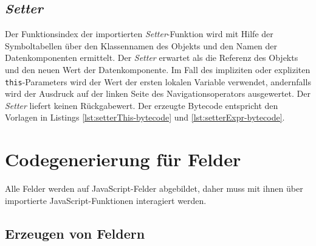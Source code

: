 



\subsection{\emph{Setter}}
\label{subsec:Zugriff-auf-Datenkomponenten-Setter}

Der Funktionsindex der importierten \emph{Setter}-Funktion wird mit Hilfe der Symboltabellen über den Klassennamen des Objekts und den Namen der Datenkomponenten ermittelt. Der \emph{Setter} erwartet als die Referenz des Objekts und den neuen Wert der Datenkomponente. Im Fall des impliziten oder expliziten \lstinline{this}-Parameters wird der Wert der ersten lokalen Variable verwendet, andernfalls wird der Ausdruck auf der linken Seite des Navigationsoperators ausgewertet. Der \emph{Setter} liefert keinen Rückgabewert. Der erzeugte Bytecode entspricht den Vorlagen in Listings \ref{lst:setterThis-bytecode} und \ref{lst:setterExpr-bytecode}.





\section{Codegenerierung für Felder}
Alle Felder werden auf JavaScript-Felder abgebildet, daher muss mit ihnen über importierte JavaScript-Funktionen interagiert werden.

\subsection{Erzeugen von Feldern}
\label{subsec:Erzeugen-von-Feldern}

